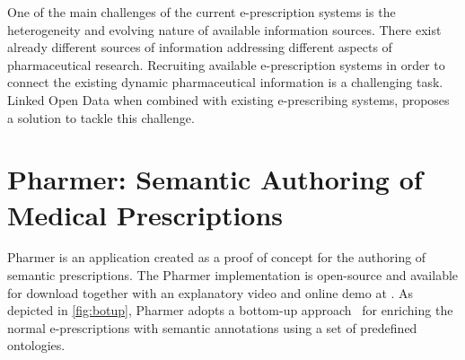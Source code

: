\documentclass[conference]{IEEEtran}
\begin{document}


One of the main challenges of the current e-prescription systems is the heterogeneity and evolving nature of available information sources.
There exist already different sources of information addressing different aspects of pharmaceutical research.
Recruiting available e-prescription systems in order to connect the existing dynamic pharmaceutical information is a challenging task.
Linked Open Data when combined with existing e-prescribing systems, proposes a solution to tackle this challenge.

\section{Pharmer: Semantic Authoring of Medical Prescriptions}
\label{sec:pharmer}
Pharmer is an application created as a proof of concept for the authoring of semantic prescriptions.
The Pharmer implementation is open-source and available for download together with an explanatory video and online demo at \cite{pharmerproject}.
As depicted in \autoref{fig:botup}, Pharmer adopts a bottom-up approach~\cite{khalili2012} for enriching the normal e-prescriptions with semantic annotations using a set of predefined ontologies.
\end{document}
